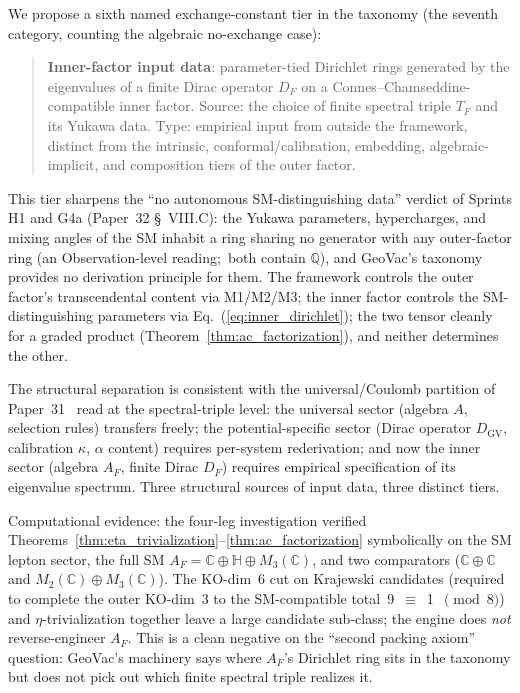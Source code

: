 \documentclass[aps,pra,twocolumn,superscriptaddress,longbibliography]{revtex4-2}
\begin{document}
We propose a sixth named exchange-constant tier in the taxonomy
(the seventh category, counting the algebraic no-exchange case):

\begin{quote}
\textbf{Inner-factor input data}: parameter-tied Dirichlet rings
generated by the eigenvalues of a finite Dirac operator $D_F$ on
a Connes--Chamseddine-compatible inner factor.  Source: the choice
of finite spectral triple $T_F$ and its Yukawa data.  Type:
empirical input from outside the framework, distinct
from the intrinsic, conformal/calibration, embedding,
algebraic-implicit, and composition tiers of the outer factor.
\end{quote}

This tier sharpens the ``no autonomous SM-distinguishing data''
verdict of Sprints H1 and G4a (Paper~32 \S~VIII.C): the
Yukawa parameters, hypercharges, and mixing angles of the SM
inhabit a ring sharing no generator with any outer-factor ring
(an Observation-level reading;\ both contain $\mathbb{Q}$), and
GeoVac's taxonomy provides no derivation principle for them.
The framework controls the outer factor's transcendental content
via M1/M2/M3; the inner factor controls the SM-distinguishing
parameters via Eq.~(\ref{eq:inner_dirichlet}); the two tensor
cleanly for a graded product (Theorem~\ref{thm:ac_factorization}), and neither
determines the other.

The structural separation is consistent with the
universal/Coulomb partition of Paper~31~\cite{loutey_paper31} read
at the spectral-triple level: the universal sector (algebra $A$,
selection rules) transfers freely; the potential-specific sector
(Dirac operator $D_{\mathrm{GV}}$, calibration $\kappa$, $\alpha$
content) requires per-system rederivation; and now the inner
sector (algebra $A_F$, finite Dirac $D_F$) requires empirical
specification of its eigenvalue spectrum.  Three structural
sources of input data, three distinct tiers.

Computational evidence: the four-leg investigation verified
Theorems~\ref{thm:eta_trivialization}--\ref{thm:ac_factorization}
symbolically on the SM lepton sector, the full SM
$A_F = \mathbb{C} \oplus \mathbb{H} \oplus M_3(\mathbb{C})$, and
two comparators ($\mathbb{C} \oplus \mathbb{C}$ and
$M_2(\mathbb{C}) \oplus M_3(\mathbb{C})$).  The KO-dim~6 cut
on Krajewski candidates (required to complete the outer KO-dim~3
to the SM-compatible total~9~$\equiv$~1~$\pmod 8$) and
$\eta$-trivialization together leave a large candidate
sub-class; the engine does \emph{not} reverse-engineer $A_F$.
This is a clean negative on the ``second packing axiom''
question: GeoVac's machinery says where $A_F$'s Dirichlet ring
sits in the taxonomy but does not pick out which finite spectral
triple realizes it.
\end{document}
